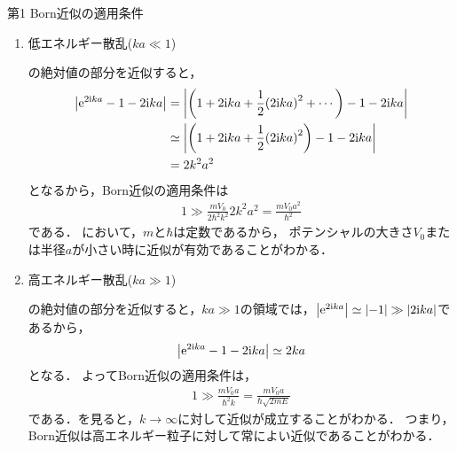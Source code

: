 \documentclass{report}
\begin{document}
\begin{myex}{第1 Born近似の適用条件}{}
    \begin{enumerate}
      \item 低エネルギー散乱($ka \ll 1$)\par
        の絶対値の部分を近似すると，
        \begin{align}
          \abs{\mathrm{e}^{2\mathrm{i} ka} - 1 - 2\mathrm{i} ka} &= \abs{\qty(1 + 2\mathrm{i} ka + \frac{1}{2}\qty(2 \mathrm{i} ka)^2 + \cdots) - 1 - 2\mathrm{i} ka}\\
          &\simeq \abs{\qty(1 + 2\mathrm{i} ka + \frac{1}{2}\qty(2 \mathrm{i} ka)^2) - 1 - 2\mathrm{i} ka} \\
          &= 2k^2 a^2
        \end{align}
        となるから，Born近似の適用条件は
        \begin{align}
          1 \gg \frac{mV_0}{2 \hbar^2 k^2}2k^2 a^2 = \frac{mV_0 a^2}{\hbar^2}\label{born-low-energy}
        \end{align}
        である．
        において，$m$と$\hbar$は定数であるから，
        ポテンシャルの大きさ$V_0$または半径$a$が小さい時に近似が有効であることがわかる．
      \item 高エネルギー散乱($ka \gg 1$)\par
        の絶対値の部分を近似すると，$ka \gg 1$の領域では，$\abs{\mathrm{e}^{2\mathrm{i} ka}} \simeq \abs{-1} \gg \abs{2\mathrm{i} ka}$であるから，
        \begin{align}
          \abs{\mathrm{e}^{2\mathrm{i} ka} - 1 - 2\mathrm{i} ka} \simeq 2ka
        \end{align}
        となる．
        よってBorn近似の適用条件は，
        \begin{align}
          1 \gg \frac{mV_0 a}{\hbar^2 k} = \frac{mV_0a}{\hbar\sqrt{2mE}}\label{born-high-energy}
        \end{align}
        である．を見ると，$k\to\infty$に対して近似が成立することがわかる．
        つまり，Born近似は高エネルギー粒子に対して常によい近似であることがわかる．
    \end{enumerate}
  \end{myex}
\end{document}
